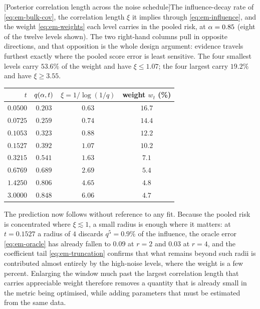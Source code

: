 \begin{center}
\begin{minipage}{\linewidth}\small\centering
{}[Posterior correlation length across the noise schedule]{The
influence-decay rate of \eqref{eq:em-bulk-cov}, the correlation length
$\xi$ it implies through \eqref{eq:em-influence}, and the weight
\eqref{eq:em-weights} each level carries in the pooled risk, at
$\alpha = 0.85$ (eight of the twelve levels shown). The two right-hand columns
pull in opposite directions, and that opposition is the whole design argument:
evidence travels furthest exactly where the pooled score error is least
sensitive. The four smallest levels carry $53.6\%$ of the weight and have
$\xi \leq 1.07$; the four largest carry $19.2\%$ and have $\xi \geq 3.55$.}
\label{tab:em-locality}
\begin{tabular}{@{}rccc@{}}
\toprule
$t$ & $q(\alpha,t)$ & $\xi = 1/\log(1/q)$ & weight $w_t$ (\%) \\
\midrule
$0.0500$ & $0.203$ & $0.63$ & $16.7$ \\
$0.0725$ & $0.259$ & $0.74$ & $14.4$ \\
$0.1053$ & $0.323$ & $0.88$ & $12.2$ \\
$0.1527$ & $0.392$ & $1.07$ & $10.2$ \\
$0.3215$ & $0.541$ & $1.63$ & $7.1$ \\
$0.6769$ & $0.689$ & $2.69$ & $5.4$ \\
$1.4250$ & $0.806$ & $4.65$ & $4.8$ \\
$3.0000$ & $0.848$ & $6.06$ & $4.7$ \\
\bottomrule
\end{tabular}
\end{minipage}
\end{center}

\noindent The prediction now follows without reference to any fit. Because the
pooled risk is concentrated where $\xi \lesssim 1$, a small radius is enough
where it matters: at $t = 0.1527$ a radius of $4$ discards $q^5 = 0.9\%$ of the
influence, the oracle error \eqref{eq:em-oracle} has already fallen to
$0.09$ at $r = 2$ and $0.03$ at $r = 4$, and the coefficient tail
\eqref{eq:em-truncation} confirms that what remains beyond such radii is
contributed almost entirely by the high-noise levels, where the weight is a
few percent. Enlarging the window much past the largest correlation length
that carries appreciable weight therefore removes a quantity that is already
small in the metric being optimised, while adding parameters that must be
estimated from the same data.

